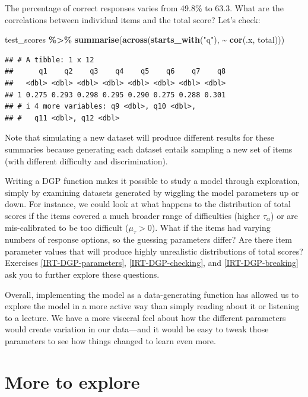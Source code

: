 \documentclass[
]{book}
\newenvironment{Shaded}{\begin{snugshade}}{\end{snugshade}}
\newcommand{\FunctionTok}[1]{\textcolor[rgb]{0.13,0.29,0.53}{\textbf{#1}}}
\newcommand{\NormalTok}[1]{#1}
\newcommand{\SpecialCharTok}[1]{\textcolor[rgb]{0.81,0.36,0.00}{\textbf{#1}}}
\newcommand{\StringTok}[1]{\textcolor[rgb]{0.31,0.60,0.02}{#1}}
\begin{document}
The percentage of correct responses varies from 49.8\% to 63.3.
What are the correlations between individual items and the total score?
Let's check:

\begin{Shaded}
\begin{Highlighting}[]
\NormalTok{test\_scores }\SpecialCharTok{\%\textgreater{}\%}
  \FunctionTok{summarise}\NormalTok{(}\FunctionTok{across}\NormalTok{(}\FunctionTok{starts\_with}\NormalTok{(}\StringTok{"q"}\NormalTok{), }\SpecialCharTok{\textasciitilde{}} \FunctionTok{cor}\NormalTok{(.x, total)))}
\end{Highlighting}
\end{Shaded}

\begin{verbatim}
## # A tibble: 1 x 12
##      q1    q2    q3    q4    q5    q6    q7    q8
##   <dbl> <dbl> <dbl> <dbl> <dbl> <dbl> <dbl> <dbl>
## 1 0.275 0.293 0.298 0.295 0.290 0.275 0.288 0.301
## # i 4 more variables: q9 <dbl>, q10 <dbl>,
## #   q11 <dbl>, q12 <dbl>
\end{verbatim}

Note that simulating a new dataset will produce different results for these summaries because generating each dataset entails sampling a new set of items (with different difficulty and discrimination).

Writing a DGP function makes it possible to study a model through exploration, simply by examining datasets generated by wiggling the model parameters up or down.
For instance, we could look at what happens to the distribution of total scores if the items covered a much broader range of difficulties (higher \(\tau_\alpha\)) or are mis-calibrated to be too difficult (\(\mu_\tau > 0\)).
What if the items had varying numbers of response options, so the guessing parameters differ?
Are there item parameter values that will produce highly unrealistic distributions of total scores?
Exercises \ref{IRT-DGP-parameters}, \ref{IRT-DGP-checking}, and \ref{IRT-DGP-breaking} ask you to further explore these questions.

Overall, implementing the model as a data-generating function has allowed us to explore the model in a more active way than simply reading about it or listening to a lecture.
We have a more visceral feel about how the different parameters would create variation in our data---and it would be easy to tweak those parameters to see how things changed to learn even more.

\section{More to explore}\label{more-to-explore}
\end{document}
